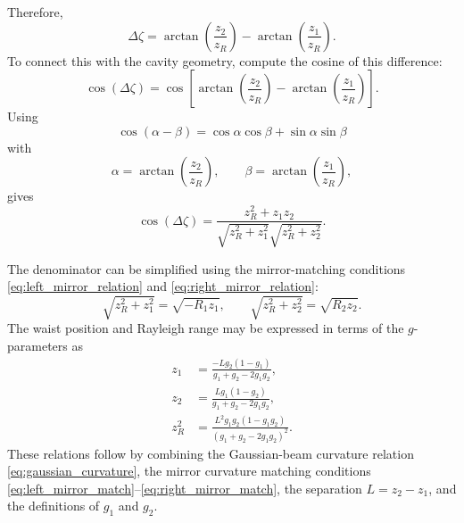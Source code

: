 \begin{resolucao}[Solution]
        Therefore,
        \begin{equation}
            \Delta\zeta
            =
            \arctan\left(\frac{z_2}{z_R}\right)
            -
            \arctan\left(\frac{z_1}{z_R}\right).
            \label{eq:gouy_difference}
        \end{equation}
        To connect this with the cavity geometry, compute the cosine of this difference:
        \begin{equation}
            \cos(\Delta\zeta)
            =
            \cos\left[
                \arctan\left(\frac{z_2}{z_R}\right)
                -
                \arctan\left(\frac{z_1}{z_R}\right)
            \right].
        \end{equation}
        Using
        \[
            \cos(\alpha-\beta)
            =
            \cos\alpha\cos\beta+\sin\alpha\sin\beta
        \]
        with
        \[
            \alpha=\arctan\left(\frac{z_2}{z_R}\right),
            \qquad
            \beta=\arctan\left(\frac{z_1}{z_R}\right),
        \]
        gives
        \begin{equation}
            \cos(\Delta\zeta)
            =
            \frac{
                z_R^2+z_1z_2
            }{
                \sqrt{z_R^2+z_1^2}
                \sqrt{z_R^2+z_2^2}
            }.
            \label{eq:cos_delta_zeta}
        \end{equation}

        The denominator can be simplified using the mirror-matching conditions \eqref{eq:left_mirror_relation} and \eqref{eq:right_mirror_relation}:
        \begin{equation}
            \sqrt{z_R^2+z_1^2}
            =
            \sqrt{-R_1z_1},
            \qquad
            \sqrt{z_R^2+z_2^2}
            =
            \sqrt{R_2z_2}.
            \label{eq:denominator_simplification}
        \end{equation}
        The waist position and Rayleigh range may be expressed in terms of the $g$-parameters as
        \begin{align}
            z_1
            &=
            \frac{
                -L g_2(1-g_1)
            }{
                g_1+g_2-2g_1g_2
            },
            \label{eq:z1_g_parameters}
            \\
            z_2
            &=
            \frac{
                L g_1(1-g_2)
            }{
                g_1+g_2-2g_1g_2
            },
            \label{eq:z2_g_parameters}
            \\
            z_R^2
            &=
            \frac{
                L^2g_1g_2(1-g_1g_2)
            }{
                \left(
                    g_1+g_2-2g_1g_2
                \right)^2
            }.
            \label{eq:zR_g_parameters}
        \end{align}
        These relations follow by combining the Gaussian-beam curvature relation \eqref{eq:gaussian_curvature}, the mirror curvature matching conditions \eqref{eq:left_mirror_match}--\eqref{eq:right_mirror_match}, the separation $L=z_2-z_1$, and the definitions of $g_1$ and $g_2$.


\end{resolucao}
